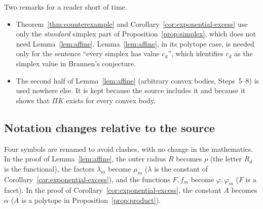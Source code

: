 \documentclass[11pt]{article}
\begin{document}
\begin{center}
\end{center}

\noindent Two remarks for a reader short of time.
\begin{itemize}[leftmargin=2em,itemsep=2pt]
\item Theorem~\ref{thm:counterexample} and
 Corollary~\ref{cor:exponential-excess} use only the \emph{standard}
 simplex part of Proposition~\ref{prop:simplex}, which does not need
 Lemma~\ref{lem:affine}. Lemma~\ref{lem:affine}, in its polytope case, is
 needed only for the sentence ``every simplex has value \(c_d\)'', which
 identifies \(c_d\) as the simplex value in Brannen's conjecture.
\item The second half of Lemma~\ref{lem:affine} (arbitrary convex bodies,
 Steps~5--8) is used nowhere else. It is kept because the source includes
 it and because it shows that \(\Pi K\) exists for every convex body.
\end{itemize}

\subsection{Notation changes relative to the source}

Four symbols are renamed to avoid clashes, with no change in the
mathematics. In the proof of Lemma~\ref{lem:affine}, the outer radius \(R\)
becomes \(\rho\) (the letter \(R_d\) is the functional), the factors
\(\lambda_m\) become \(\mu_m\) (\(\lambda\) is the constant of
Corollary~\ref{cor:exponential-excess}), and the functions \(F,f_m\) become
\(\varphi,\varphi_m\) (\(F\) is a facet). In the proof of
Corollary~\ref{cor:exponential-excess}, the constant \(A\) becomes
\(\alpha\) (\(A\) is a polytope in Proposition~\ref{prop:product}).
\end{document}
